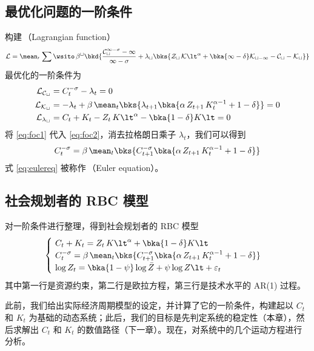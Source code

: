 \subsection{最优化问题的一阶条件}\label{subsec:OptProbFOC}

构建\,（Lagrangian function）
\begin{align}
    \cal L=\mean_0\,\sum\wsito\,\beta^t\bkd{\dfrac{C_t^{1-\sigma}-1}{1-\sigma}+\lambda_t\bks{Z_t\,K\lt^\alpha+\bka{1-\delta}K_{t-1}-C_t-K_t}}
\end{align}
最优化的一阶条件为
\begin{align}
    \cal L_{C_t}&=C_t^{-\sigma}-\lambda_t=0 \label{eq:foc1}\\
    \cal L_{K_t}&=-\lambda_t+\beta\,\mean_t\bks{\lambda_{t+1}\bka{\alpha\, Z_{t+1}\,K_t^{\alpha-1}+1-\delta}}=0\label{eq:foc2}\\
    \cal L_{\lambda_t}&=C_t+K_t-Z_t\,K\lt^\alpha-\bka{1-\delta}K\lt=0\label{eq:foc3}
\end{align}
将 \ref{eq:foc1} 代入 \ref{eq:foc2}，消去拉格朗日乘子 \(\lambda_t\)，我们可以得到
\begin{align}
    C_t^{-\sigma}=\beta\,\mean_t\bks{C_{t+1}^{-\sigma}\bka{\alpha\, Z_{t+1}\,K_t^{\alpha-1}+1-\delta}}\label{eq:eulereq}
\end{align}
式 \ref{eq:eulereq} 被称作\,（Euler equation）。

\subsection{社会规划者的 RBC 模型}\label{subsec:RBCModel}

对一阶条件进行整理，得到社会规划者的 RBC 模型
\begin{equation}
    \begin{cases}
        \ C_t+K_t=Z_t\,K\lt^\alpha+\bka{1-\delta}K\lt \\
        \ C_t^{-\sigma}=\beta\,\mean_t\bks{C_{t+1}^{-\sigma}\bka{\alpha\, Z_{t+1}\,K_t^{\alpha-1}+1-\delta}}\\
        \ \log Z_t=\bka{1-\psi}\log\bar Z+\psi\log Z\lt+\varepsilon_t
    \end{cases}\label{eq:RBCModel}
\end{equation}
其中第一行是资源约束，第二行是欧拉方程，第三行是技术水平的 AR(1) 过程。

此前，我们给出实际经济周期模型的设定，并计算了它的一阶条件，构建起以 \(C_t\) 和 \(K_t\) 为基础的动态系统；此后，我们的目标是先判定系统的稳定性（本章），然后求解出 \(C_t\) 和 \(K_t\) 的数值路径（下一章）。现在，对系统中的几个运动方程进行分析。

